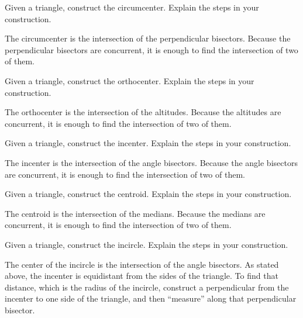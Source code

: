 \documentclass[nooutcomes]{ximera}
\begin{document}
\begin{problem}
Given a triangle, construct the circumcenter. Explain the steps
  in your construction.
\begin{freeResponse}
\begin{hint}
The circumcenter is the intersection of the perpendicular bisectors.  Because the perpendicular bisectors are concurrent, it is enough to find the intersection of two of them.  
\end{hint}
\end{freeResponse}
\end{problem}

\begin{problem}
Given a triangle, construct the orthocenter. Explain the steps
  in your construction.
\begin{freeResponse}
\begin{hint}
The orthocenter is the intersection of the altitudes.  Because the altitudes are concurrent, it is enough to find the intersection of two of them.  
\end{hint}
\end{freeResponse}
\end{problem}

\begin{problem}
Given a triangle, construct the incenter. Explain the steps in
  your construction.
\begin{freeResponse}
\begin{hint}
The incenter is the intersection of the angle bisectors.  Because the angle bisectors are concurrent, it is enough to find the intersection of two of them.  
\end{hint}
\end{freeResponse}
\end{problem}

\begin{problem}
Given a triangle, construct the centroid. Explain the steps in
  your construction.
\begin{freeResponse}
\begin{hint}
The centroid is the intersection of the medians.  Because the medians are concurrent, it is enough to find the intersection of two of them.  
\end{hint}
\end{freeResponse}
\end{problem}

\begin{problem}
Given a triangle, construct the incircle. Explain the steps in
  your construction.
\begin{freeResponse}
\begin{hint}
The center of the incircle is the intersection of the angle bisectors.  As stated above, the incenter is equidistant from the sides of the triangle.  To find that distance, which is the radius of the incircle, construct a perpendicular from the incenter to one side of the triangle, and then ``measure'' along that perpendicular bisector. 
\end{hint}
\end{freeResponse}
\end{problem}
\end{document}
